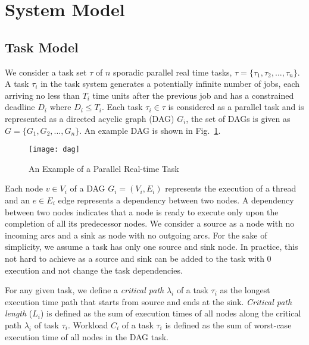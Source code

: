 \section{System Model}

\subsection{Task Model}
We consider a task set $\tau$ of ${n}$ sporadic parallel real time tasks,
$\tau = \{\tau_1,\tau_2, ..., \tau_n\}$. A task $\tau_i$ in the task
system generates a potentially infinite number of jobs, each arriving
no less than $T_i$ time units after the previous job and has a constrained
deadline $D_i$ where $D_i \leq T_i$.  Each task $\tau_i \in \tau$ is
considered as a parallel task and is represented as a directed acyclic
graph (DAG) ${G_i}$, the set of DAGs is given as ${G = \{G_1, G_2,
  ..., G_n\}}$. An example DAG is shown in Fig.~\ref{fig:dag}.

\begin{figure}[!h]
  \centering
  \texttt{[image: dag]}
  \caption{An Example of a Parallel Real-time Task}
  \label{fig:dag}
\end{figure}

Each node ${v \in V_i}$ of a DAG ${G_i = (V_i, E_i)}$ represents the
execution of a thread and an ${e \in E_i}$ edge represents a
dependency between two nodes. A dependency between two nodes indicates
that a node is ready to execute only upon the completion of all its
predecessor nodes. We consider a source as a node with no incoming
arcs and a sink as node with no outgoing arcs. For the sake of
simplicity, we assume a task has only one source and sink node. In
practice, this not hard to achieve as a source and sink can be added
to the task with $0$ execution and not change the task dependencies.

For any given task, we define a \textit{critical path} $\lambda_i$ of a 
task $\tau_i$ as the longest execution time path that starts from
source and ends at the sink. \textit{Critical path length} ($L_i$) is
defined as the sum of execution times of all nodes along the critical
path $\lambda_i$ of task $\tau_i$.  Workload $C_i$ of
a task $\tau_i$ is defined as the sum of worst-case execution time of
all nodes in the DAG task. 


